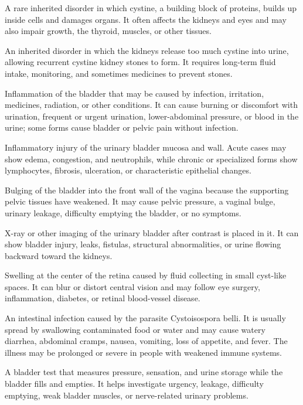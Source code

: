  A rare inherited disorder in which cystine, a building block of proteins, builds up inside cells and damages organs. It often affects the kidneys and eyes and may also impair growth, the thyroid, muscles, or other tissues.

 An inherited disorder in which the kidneys release too much cystine into urine, allowing recurrent cystine kidney stones to form. It requires long-term fluid intake, monitoring, and sometimes medicines to prevent stones.

 Inflammation of the bladder that may be caused by infection, irritation, medicines, radiation, or other conditions. It can cause burning or discomfort with urination, frequent or urgent urination, lower-abdominal pressure, or blood in the urine; some forms cause bladder or pelvic pain without infection.

 Inflammatory injury of the urinary bladder mucosa and wall. Acute cases may show edema, congestion, and neutrophils, while chronic or specialized forms show lymphocytes, fibrosis, ulceration, or characteristic epithelial changes.

 Bulging of the bladder into the front wall of the vagina because the supporting pelvic tissues have weakened. It may cause pelvic pressure, a vaginal bulge, urinary leakage, difficulty emptying the bladder, or no symptoms.

 X-ray or other imaging of the urinary bladder after contrast is placed in it. It can show bladder injury, leaks, fistulas, structural abnormalities, or urine flowing backward toward the kidneys.

 Swelling at the center of the retina caused by fluid collecting in small cyst-like spaces. It can blur or distort central vision and may follow eye surgery, inflammation, diabetes, or retinal blood-vessel disease.

 An intestinal infection caused by the parasite Cystoisospora belli. It is usually spread by swallowing contaminated food or water and may cause watery diarrhea, abdominal cramps, nausea, vomiting, loss of appetite, and fever. The illness may be prolonged or severe in people with weakened immune systems.

 A bladder test that measures pressure, sensation, and urine storage while the bladder fills and empties. It helps investigate urgency, leakage, difficulty emptying, weak bladder muscles, or nerve-related urinary problems.

